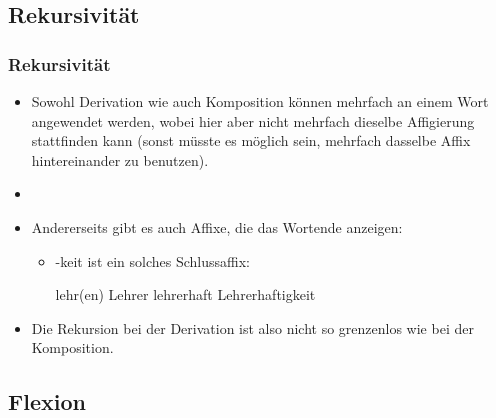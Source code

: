 \subsection{Rekursivität}



\begin{frame}
\frametitle{Rekursivität}

\begin{itemize}
	\item Sowohl Derivation wie auch Komposition können mehrfach an einem Wort angewendet werden, wobei hier aber nicht mehrfach dieselbe Affigierung stattfinden kann (sonst müsste es möglich sein, mehrfach dasselbe Affix hintereinander zu benutzen).
	\item[]
	\item Andererseits gibt es auch Affixe, die das Wortende anzeigen:
	
	\begin{itemize}
		\item -keit ist ein solches Schlussaffix:
		
		\ea lehr(en) \ras Lehrer \ras lehrerhaft \ras Lehrerhaftigkeit
		\z
		
	\end{itemize}
	
	\item Die Rekursion bei der Derivation ist also nicht so grenzenlos wie bei der Komposition.
	
\end{itemize}


\end{frame}


\subsection{Flexion}



